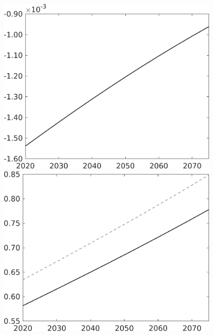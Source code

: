 \documentclass[12pt]{article}
\begin{document}
\begin{figure}[h!!]
\begin{minipage}[]{0.32\textwidth}
\end{minipage}	
\begin{minipage}[]{0.32\textwidth}
\includegraphics[width=1\textwidth]{../../codding_model/own_basedOnFried/optimalPol_010922_revision/figures/all_13Sept22/CompTaul_LFBAUPer_Reg0_EY_spillover0_nsk0_xgr1_knspil1_sep1_countec0_GovRev0_etaa0.79.png}
\end{minipage}	
\begin{minipage}[]{0.32\textwidth}
	\includegraphics[width=1\textwidth]{../../codding_model/own_basedOnFried/optimalPol_010922_revision/figures/all_13Sept22/CompTaul_LFBAU_Reg0_N_spillover0_nsk0_xgr1_knspil1_sep1_countec0_GovRev0_etaa0.79_lgd0.png}

\end{minipage}
\end{figure}
\end{document}
